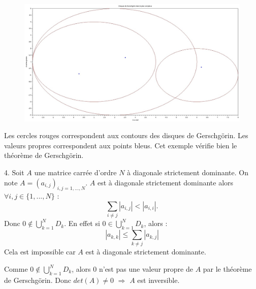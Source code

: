 \documentclass[a4paper,11pt]{article}
\begin{document}
\begin{figure}[H]
	\centering
	\includegraphics[width=420pt]{graphes/exercice7.jpg}	
\end{figure}

Les cercles rouges correspondent aux contours des disques de Gerschgörin. Les valeurs propres correspondent aux points bleus. Cet exemple vérifie bien le théorème de Gerschgörin.

	4. Soit $A$ une matrice carrée d'ordre $N$ à diagonale strictement dominante. On note $A = (a_{i,j})_{i,j=1,...,N}$.
	$A$ est à diagonale strictement dominante alors $\forall i, j \in \{1, ..., N\}$ :
	\begin{equation*}
		\sum\limits_{i \neq j} |a_{i, j}| < |a_{i, i}|.
	\end{equation*}
	Donc $0 \notin \bigcup\limits_{k=1}^{N} D_{k}$. En effet si $0 \in \bigcup\limits_{k=1}^{N} D_{k}$, alors :
	\begin{equation*}
		|a_{k, k}| \leqslant \sum\limits_{k \neq j} |a_{k, j}|
	\end{equation*}
	Cela est impossible car $A$ est à diagonale strictement dominante.
	
	Comme $0 \notin \bigcup\limits_{k=1}^{N} D_{k}$, alors $0$ n'est pas une valeur propre de $A$ par le théorème de Gerschgörin.
	Donc $det(A) \neq 0$ $\Longrightarrow$ $A$ est inversible.
\end{document}
